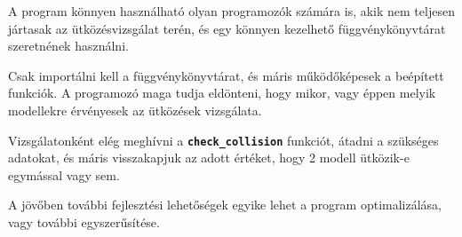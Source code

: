 
A program könnyen használható olyan programozók számára is, akik nem teljesen jártasak az ütközésvizsgálat terén, és egy könnyen kezelhető függvénykönyvtárat szeretnének használni.

Csak importálni kell a függvénykönyvtárat, és máris működőképesek a beépített funkciók. A programozó maga tudja eldönteni, hogy mikor, vagy éppen melyik modellekre érvényesek az ütközések vizsgálata.

Vizsgálatonként elég meghívni a \textbf{\texttt{check\_collision}} funkciót, átadni a szükséges adatokat, és máris visszakapjuk az adott értéket, hogy 2 modell ütközik-e egymással vagy sem.

A jövőben további fejlesztési lehetőségek egyike lehet a program optimalizálása, vagy további egyszerűsítése.